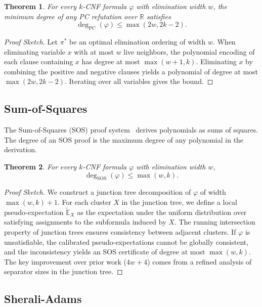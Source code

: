 \documentclass[11pt]{article}
\newtheorem{theorem}{Theorem}
\begin{document}
\begin{theorem}
\label{thm:pc}
For every $k$-CNF formula $\varphi$ with elimination width $w$, the minimum degree of any PC refutation over $\mathbb{R}$ satisfies
\[
\deg_{\mathrm{PC}}(\varphi) \leq \max(2w, 2k-2).
\]
\end{theorem}

\begin{proof}[Proof Sketch]
Let $\pi^*$ be an optimal elimination ordering of width $w$. When eliminating variable $x$ with at most $w$ live neighbors, the polynomial encoding of each clause containing $x$ has degree at most $\max(w+1, k)$. Eliminating $x$ by combining the positive and negative clauses yields a polynomial of degree at most $\max(2w, 2k-2)$. Iterating over all variables gives the bound.
\end{proof}

\subsection{Sum-of-Squares}

The Sum-of-Squares (SOS) proof system~\cite{shor1987class, lasserre2001global} derives polynomials as sums of squares. The degree of an SOS proof is the maximum degree of any polynomial in the derivation.

\begin{theorem}
\label{thm:sos}
For every $k$-CNF formula $\varphi$ with elimination width $w$,
\[
\deg_{\mathrm{SOS}}(\varphi) \leq \max(w, k).
\]
\end{theorem}

\begin{proof}[Proof Sketch]
We construct a junction tree decomposition of $\varphi$ of width $\max(w, k) + 1$. For each cluster $X$ in the junction tree, we define a local pseudo-expectation $\tilde{\mathbb{E}}_X$ as the expectation under the uniform distribution over satisfying assignments to the subformula induced by $X$. The running intersection property of junction trees ensures consistency between adjacent clusters. If $\varphi$ is unsatisfiable, the calibrated pseudo-expectations cannot be globally consistent, and the inconsistency yields an SOS certificate of degree at most $\max(w, k)$. The key improvement over prior work ($4w+4$) comes from a refined analysis of separator sizes in the junction tree.
\end{proof}

\subsection{Sherali-Adams}
\end{document}
